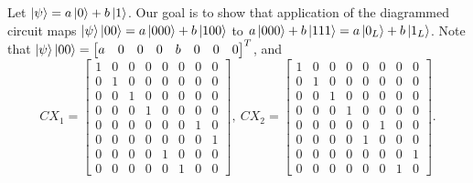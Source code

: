 \Soln Let $\ket{\psi} = a\ket{0}+b\ket{1}$.  Our goal is to show that application of the diagrammed circuit maps $\ket{\psi}\ket{00} = a\ket{000}+b\ket{100}$ to $a\ket{000}+b\ket{111} = a\ket{0_L}+b\ket{1_L}$.  Note that $\ket{\psi}\ket{00} = \begin{bmatrix}a & 0 & 0 & 0 & b & 0 & 0 & 0\end{bmatrix}^T$, and $$CX_1 = \begin{bmatrix}1 & 0 & 0 & 0 & 0 & 0 & 0 & 0 \\ 0 & 1 & 0 & 0 & 0 & 0 & 0 & 0 \\ 0 & 0 & 1 & 0 & 0 & 0 & 0 & 0 \\ 0 & 0 & 0 & 1 & 0 & 0 & 0 & 0 \\ 0 & 0 & 0 & 0 & 0 & 0 & 1 & 0 \\ 0 & 0 & 0 & 0 & 0 & 0 & 0 & 1 \\ 0 & 0 & 0 & 0 & 1 & 0 & 0 & 0 \\ 0 & 0 & 0 & 0 & 0 & 1 & 0 & 0\end{bmatrix},\ 
CX_2 = \begin{bmatrix}1 & 0 & 0 & 0 & 0 & 0 & 0 & 0 \\ 0 & 1 & 0 & 0 & 0 & 0 & 0 & 0 \\ 0 & 0 & 1 & 0 & 0 & 0 & 0 & 0 \\ 0 & 0 & 0 & 1 & 0 & 0 & 0 & 0 \\ 0 & 0 & 0 & 0 & 0 & 1 & 0 & 0 \\ 0 & 0 & 0 & 0 & 1 & 0 & 0 & 0 \\ 0 & 0 & 0 & 0 & 0 & 0 & 0 & 1 \\ 0 & 0 & 0 & 0 & 0 & 0 & 1 & 0\end{bmatrix}.$$

